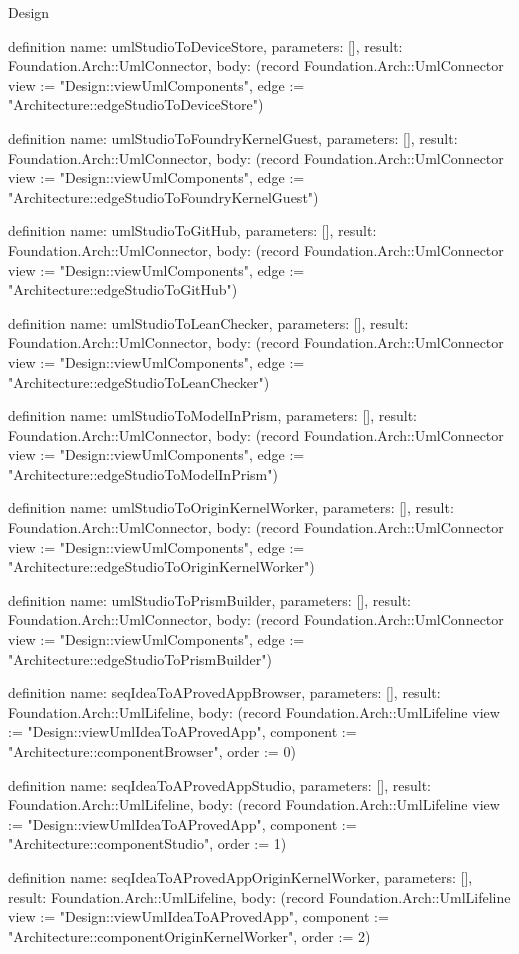 \begin{lexlean}{Design}
\begin{semanticmodule}
definition{
  name: umlStudioToDeviceStore,
  parameters: [],
  result: Foundation.Arch::UmlConnector,
  body: (record Foundation.Arch::UmlConnector {view := "Design::viewUmlComponents", edge := "Architecture::edgeStudioToDeviceStore"})
}

definition{
  name: umlStudioToFoundryKernelGuest,
  parameters: [],
  result: Foundation.Arch::UmlConnector,
  body: (record Foundation.Arch::UmlConnector {view := "Design::viewUmlComponents", edge := "Architecture::edgeStudioToFoundryKernelGuest"})
}

definition{
  name: umlStudioToGitHub,
  parameters: [],
  result: Foundation.Arch::UmlConnector,
  body: (record Foundation.Arch::UmlConnector {view := "Design::viewUmlComponents", edge := "Architecture::edgeStudioToGitHub"})
}

definition{
  name: umlStudioToLeanChecker,
  parameters: [],
  result: Foundation.Arch::UmlConnector,
  body: (record Foundation.Arch::UmlConnector {view := "Design::viewUmlComponents", edge := "Architecture::edgeStudioToLeanChecker"})
}

definition{
  name: umlStudioToModelInPrism,
  parameters: [],
  result: Foundation.Arch::UmlConnector,
  body: (record Foundation.Arch::UmlConnector {view := "Design::viewUmlComponents", edge := "Architecture::edgeStudioToModelInPrism"})
}

definition{
  name: umlStudioToOriginKernelWorker,
  parameters: [],
  result: Foundation.Arch::UmlConnector,
  body: (record Foundation.Arch::UmlConnector {view := "Design::viewUmlComponents", edge := "Architecture::edgeStudioToOriginKernelWorker"})
}

definition{
  name: umlStudioToPrismBuilder,
  parameters: [],
  result: Foundation.Arch::UmlConnector,
  body: (record Foundation.Arch::UmlConnector {view := "Design::viewUmlComponents", edge := "Architecture::edgeStudioToPrismBuilder"})
}

definition{
  name: seqIdeaToAProvedAppBrowser,
  parameters: [],
  result: Foundation.Arch::UmlLifeline,
  body: (record Foundation.Arch::UmlLifeline {view := "Design::viewUmlIdeaToAProvedApp", component := "Architecture::componentBrowser", order := 0})
}

definition{
  name: seqIdeaToAProvedAppStudio,
  parameters: [],
  result: Foundation.Arch::UmlLifeline,
  body: (record Foundation.Arch::UmlLifeline {view := "Design::viewUmlIdeaToAProvedApp", component := "Architecture::componentStudio", order := 1})
}

definition{
  name: seqIdeaToAProvedAppOriginKernelWorker,
  parameters: [],
  result: Foundation.Arch::UmlLifeline,
  body: (record Foundation.Arch::UmlLifeline {view := "Design::viewUmlIdeaToAProvedApp", component := "Architecture::componentOriginKernelWorker", order := 2})
}


\end{semanticmodule}
\end{lexlean}
